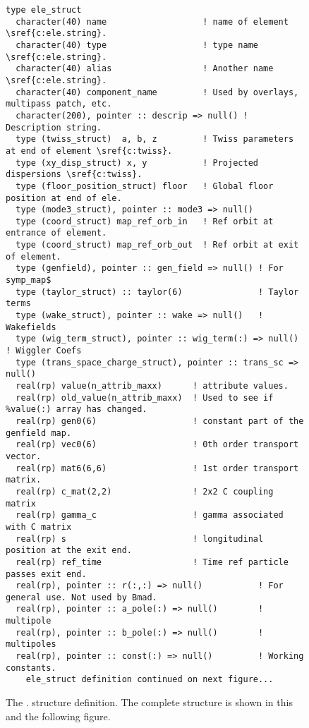\begin{figure}[tb]
\centering
\footnotesize
\begin{verbatim}
type ele_struct
  character(40) name                   ! name of element \sref{c:ele.string}.
  character(40) type                   ! type name \sref{c:ele.string}.
  character(40) alias                  ! Another name \sref{c:ele.string}.
  character(40) component_name         ! Used by overlays, multipass patch, etc.
  character(200), pointer :: descrip => null() ! Description string.
  type (twiss_struct)  a, b, z         ! Twiss parameters at end of element \sref{c:twiss}.
  type (xy_disp_struct) x, y           ! Projected dispersions \sref{c:twiss}.
  type (floor_position_struct) floor   ! Global floor position at end of ele.
  type (mode3_struct), pointer :: mode3 => null()
  type (coord_struct) map_ref_orb_in   ! Ref orbit at entrance of element.
  type (coord_struct) map_ref_orb_out  ! Ref orbit at exit of element.
  type (genfield), pointer :: gen_field => null() ! For symp_map$
  type (taylor_struct) :: taylor(6)               ! Taylor terms
  type (wake_struct), pointer :: wake => null()   ! Wakefields
  type (wig_term_struct), pointer :: wig_term(:) => null()   ! Wiggler Coefs
  type (trans_space_charge_struct), pointer :: trans_sc => null()
  real(rp) value(n_attrib_maxx)      ! attribute values.
  real(rp) old_value(n_attrib_maxx)  ! Used to see if %value(:) array has changed.
  real(rp) gen0(6)                   ! constant part of the genfield map.
  real(rp) vec0(6)                   ! 0th order transport vector.
  real(rp) mat6(6,6)                 ! 1st order transport matrix.
  real(rp) c_mat(2,2)                ! 2x2 C coupling matrix
  real(rp) gamma_c                   ! gamma associated with C matrix
  real(rp) s                         ! longitudinal position at the exit end.
  real(rp) ref_time                  ! Time ref particle passes exit end.
  real(rp), pointer :: r(:,:) => null()           ! For general use. Not used by Bmad.
  real(rp), pointer :: a_pole(:) => null()        ! multipole
  real(rp), pointer :: b_pole(:) => null()        ! multipoles
  real(rp), pointer :: const(:) => null()         ! Working constants.
    ele_struct definition continued on next figure...
\end{verbatim}
\caption[The . Part 1]{The . structure definition. 
The complete structure is shown in this and the following figure.}
\label{f:ele.struct1}
\end{figure}

